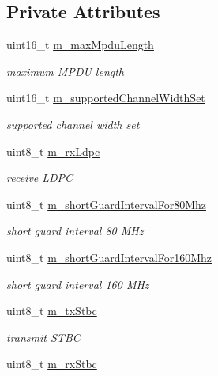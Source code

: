 \subsection*{Private Attributes}
\begin{DoxyCompactItemize}
\item 
uint16\+\_\+t \hyperlink{classns3_1_1VhtCapabilities_a50f9372914daf48375359a4159cd3ad0}{m\+\_\+max\+Mpdu\+Length}
\begin{DoxyCompactList}\small\item\em maximum M\+P\+DU length \end{DoxyCompactList}\item 
uint16\+\_\+t \hyperlink{classns3_1_1VhtCapabilities_a5beb0948abe32fd1b77317b6057d1639}{m\+\_\+supported\+Channel\+Width\+Set}
\begin{DoxyCompactList}\small\item\em supported channel width set \end{DoxyCompactList}\item 
uint8\+\_\+t \hyperlink{classns3_1_1VhtCapabilities_ac7538c76efb246f9c076a69d605c8d65}{m\+\_\+rx\+Ldpc}
\begin{DoxyCompactList}\small\item\em receive L\+D\+PC \end{DoxyCompactList}\item 
uint8\+\_\+t \hyperlink{classns3_1_1VhtCapabilities_a17def5a3281c3fbecb315a9f0ccc2d8d}{m\+\_\+short\+Guard\+Interval\+For80\+Mhz}
\begin{DoxyCompactList}\small\item\em short guard interval 80 M\+Hz \end{DoxyCompactList}\item 
uint8\+\_\+t \hyperlink{classns3_1_1VhtCapabilities_aaaba1407325ab2e1eb5d0a063058e6e4}{m\+\_\+short\+Guard\+Interval\+For160\+Mhz}
\begin{DoxyCompactList}\small\item\em short guard interval 160 M\+Hz \end{DoxyCompactList}\item 
uint8\+\_\+t \hyperlink{classns3_1_1VhtCapabilities_a67911a0a1dbc994b8b9c79567cc1059b}{m\+\_\+tx\+Stbc}
\begin{DoxyCompactList}\small\item\em transmit S\+T\+BC \end{DoxyCompactList}\item 
uint8\+\_\+t \hyperlink{classns3_1_1VhtCapabilities_a6dccb436c32dda6ccbdbaf67928cdece}{m\+\_\+rx\+Stbc}

\end{DoxyCompactItemize}
